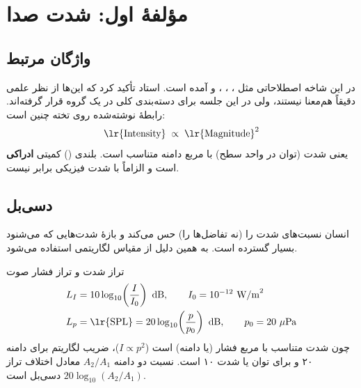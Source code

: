 \section{مؤلفهٔ اول: شدت صدا}

\subsection{واژگان مرتبط}
در این شاخه اصطلاحاتی مثل ، ، ،  و  آمده است. استاد تأکید کرد که این‌ها از نظر علمی دقیقاً هم‌معنا نیستند، ولی در این جلسه برای دسته‌بندی کلی در یک گروه قرار گرفته‌اند. رابطهٔ نوشته‌شده روی تخته چنین است:
\[
\text{\lr{Intensity}} \;\propto\; \text{\lr{Magnitude}}^{2}
\]
یعنی شدت (توان در واحد سطح) با مربع دامنه متناسب است. بلندی () کمیتی \textbf{ادراکی} است و الزاماً با شدت فیزیکی برابر نیست.

\subsection{دسی‌بل}
انسان نسبت‌های شدت را (نه تفاضل‌ها را) حس می‌کند و بازهٔ شدت‌هایی که می‌شنود بسیار گسترده است. به همین دلیل از مقیاس لگاریتمی  استفاده می‌شود.

\begin{definitionbox}{تراز شدت و تراز فشار صوت}
\begin{align*}
L_I &= 10\log_{10}\!\left(\frac{I}{I_0}\right)\ \text{dB}, \qquad I_0=10^{-12}\ \text{W/m}^2 \\
L_p &= \text{\lr{SPL}} = 20\log_{10}\!\left(\frac{p}{p_0}\right)\ \text{dB}, \qquad p_0=20\ \mu\text{Pa}
\end{align*}
چون شدت متناسب با مربع فشار (یا دامنه) است ($I\propto p^2$)، ضریب لگاریتم برای دامنه ۲۰ و برای توان یا شدت ۱۰ است. نسبت دو دامنه $A_2/A_1$ معادل اختلاف تراز $20\log_{10}(A_2/A_1)$ دسی‌بل است.
\end{definitionbox}

